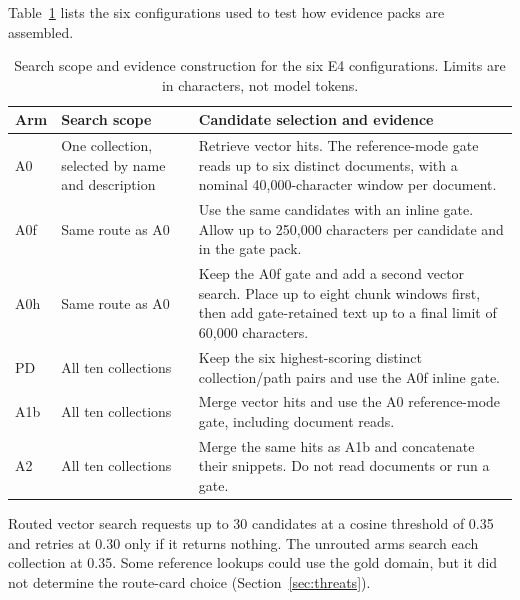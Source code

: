 Table~\ref{tab:ablation-configs} lists the six configurations used to test
how evidence packs are assembled.
\begin{table}[!ht]
\centering
\small
\setlength{\tabcolsep}{3pt}
\renewcommand{\arraystretch}{1.16}
\caption{Search scope and evidence construction for the six E4 configurations.
Limits are in characters, not model tokens.}
\label{tab:ablation-configs}
\begin{tabular}{@{}l>{\raggedright\arraybackslash}p{}>{\raggedright\arraybackslash}p{}@{}}
\toprule
Arm & Search scope & Candidate selection and evidence\\
\midrule
A0 & One collection, selected by name and description & Retrieve vector hits. The reference-mode gate reads up to six distinct documents, with a nominal 40{,}000-character window per document.\\
A0f & Same route as A0 & Use the same candidates with an inline gate. Allow up to 250{,}000 characters per candidate and in the gate pack.\\
A0h & Same route as A0 & Keep the A0f gate and add a second vector search. Place up to eight chunk windows first, then add gate-retained text up to a final limit of 60{,}000 characters.\\
PD & All ten collections & Keep the six highest-scoring distinct collection/path pairs and use the A0f inline gate.\\
A1b & All ten collections & Merge vector hits and use the A0 reference-mode gate, including document reads.\\
A2 & All ten collections & Merge the same hits as A1b and concatenate their snippets. Do not read documents or run a gate.\\
\bottomrule
\end{tabular}
\end{table}

Routed vector search requests up to 30 candidates at a cosine threshold of
0.35 and retries at 0.30 only if it returns nothing. The unrouted arms search
each collection at 0.35. Some reference lookups could use the gold domain,
but it did not determine the route-card choice (Section~\ref{sec:threats}).

